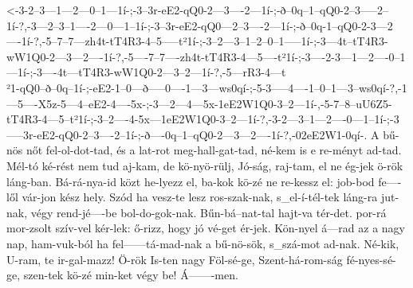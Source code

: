 
  {<-3-2--3---1---2---0--1---1í-;-3--3r-eE2-qQ0-2---3----2---1í-;-ð--0q--1--qQ0-2--3-----2--1í-?,-3---2--3--1----2---0---1--1í-;-3--3r-eE2-qQ0---2--3----2---1í-;-ð--0q-1--qQ0-2-3---2----1í-?,-5--7--7---zh4t-tT4R3-4--5-----t²1í-;-3--2---3--1--2--0--1-----1í-;-3---4t--tT4R3-wW1Q0-2---3---2----1í-?,-5----7--7----zh4t-tT4R3-4---5----t²1í-;-3----2-3---1---2----0--1---1í-;-3----4t---tT4R3-wW1Q0-2---3--2---1í-?,-5---rR3-4---t\\²1-qQ0--ð--0q--1í-;-eE2-1--0---ð-----0----1---3---ws0qí-;-5-3-----4----1--0--1---3--ws0qí-?,-1---5----X5z-5---4--eE2-4----5x-;-3---2---4---5x-1eE2W1Q0-3--2---1í-,-5-7--8--uU6Z5-tT4R3-4---5--t²1í-;-3--2----4-5x---1eE2W1Q0-3--2---1í-?,-3-2---3--1---2----0---1--1í-;-3-----3r-eE2-qQ0-2--3----2--1í-;-ð----0q--1--qQ0-2---3---2----1í-?,-02eE2W1-0qí-.}
  {  A bű-nös nőt fel-ol-dot-tad, és a  lat-rot meg-hall-gat-tad, né-kem is e   re-ményt ad-tad.  Mél-tó ké-rést nem tud aj-kam, de kö-nyö-rülj, Jó-ság, raj-tam, el ne ég-jek ö-rök láng-ban.  Bá-rá-nya-id   közt  he-lyezz el,    ba-kok kö-zé ne re-kessz el:  job-bod fe----lől   vár-jon kész hely. Szód ha vesz-te   lesz  ros-szak-nak,   s_el-í-tél-tek láng-ra jut-nak, végy rend-jé----be    bol-do-gok-nak.  Bűn-bá--nat-tal   hajt-va tér-det. por-rá mor-zsolt szív-vel kér-lek:    ő-rizz, hogy jó vé-get ér-jek.     Kön-nyel á---rad az a   nagy nap, ham-vuk-ból ha fel------tá-mad-nak  a bű-nö-sök,  s_szá-mot ad-nak.   Né-kik, U-ram, te       ir-gal-mazz! Ö-rök Is-ten nagy Föl-sé-ge,  Szent-há-rom-ság fé-nyes-sé-ge,  szen-tek kö-zé  min-ket végy be!   Á-------men.}